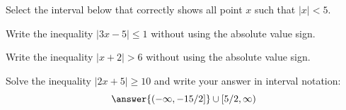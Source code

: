 \documentclass{ximera}
\begin{document}
\begin{problem}
  Select the interval below that correctly shows all point $x$ such that $|x| < 5$.
  \begin{multipleChoice}
  \end{multipleChoice}
\end{problem}

\begin{problem}
  Write the inequality $|3x - 5| \le 1$ without using the absolute value sign.
  \begin{multipleChoice}
  \end{multipleChoice}
\end{problem}

\begin{problem}
  Write the inequality $|x + 2| > 6$ without using the absolute value sign.
  \begin{multipleChoice}
  \end{multipleChoice}
\end{problem}

\begin{problem}
  Solve the inequality $|2x + 5| \ge 10$ and write your answer in interval notation:
  \[
    \answer{(-\infty, -15/2]} \cup [5/2, \infty)
  \]
\end{problem}
\end{document}
